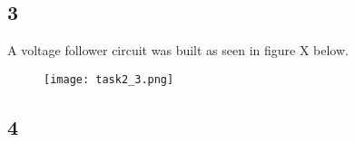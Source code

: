 \subsection*{3}

    A voltage follower circuit was built as seen in figure X below.\\
    
    \begin{figure}[h!]
        \centering
        \texttt{[image: task2\_3.png]}
    \end{figure}


\subsection*{4}
